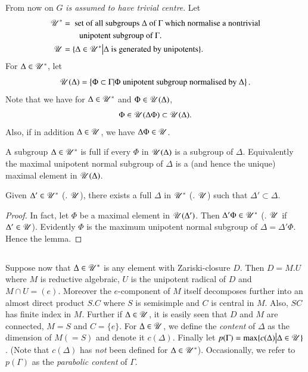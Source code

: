 \subsection{}\label{art9-subsec2.12}
From now on $G$ \textit{is assumed to have trivial centre}. Let
\begin{align*}
\mathscr{U}^\ast & = \text{ set of all subgroups $\Delta$ of $\Gamma$ which normalise a nontrivial}\\
& \text{\qquad  unipotent subgroup of $\Gamma$.}\\
\mathscr{U} & =  \{\Delta \in \mathscr{U}^\ast \big| \Delta \text{ is generated by unipotents} \}.
\end{align*}
For $\Delta \in \mathscr{U}^\ast$, let
$$
\mathscr{U} (\Delta) = \left\{\Phi \subset \Gamma | \Phi \text{ unipotent subgroup normalised by $\Delta$} \right\}. 
$$\pageoriginale 
Note that we have for $\Delta \in \mathscr{U}^\ast$ and $\Phi \in \mathscr{U} (\Delta)$,
$$
\Phi \in \mathscr{U} (\Delta \Phi) \subset \mathscr{U} (\Delta).
$$
Also, if in addition $\Delta \in \mathscr{U}$, we have $\Delta \Phi \in \mathscr{U}$.   

\setcounter{definition}{12}
\begin{definition}\label{art9-def2.13}
A subgroup $\Delta \in \mathscr{U}^\ast$ is full if every $\Phi$ in $\mathscr{U}(\Delta)$ is a subgroup of $\Delta$. Equivalently the maximal unipotent normal subgroup  of $\Delta$ is a (and hence the {\rm unique}) maximal element in $\mathscr{U} (\Delta)$. 
\end{definition}

\begin{lemma}\label{art9-lem2.14}
Given $\Delta' \in \mathscr{U}^\ast$ (\resp. $\mathscr{U}$), there exists a full $\Delta$ in $\mathscr{U}^\ast$ (\resp. $\mathscr{U}$) such that $\Delta' \subset \Delta$.
\end{lemma}

\begin{proof}
In fact, let $\Phi$ be a maximal element in $\mathscr{U}(\Delta')$. Then $\Delta' \Phi \in \mathscr{U}^\ast$ (\resp. $\mathscr{U}$ if $\Delta' \in \mathscr{U}$). Evidently $\Phi$ is the maximum unipotent normal subgroup of $\Delta = \Delta' \Phi$. Hence the lemma. 
\end{proof}

\setcounter{subsection}{14}
\subsection{}\label{art9-subsec2.15}
Suppose now that $\Delta \in \mathscr{U}^\ast$ is any element with Zariski-closure $D$. Then $D = M. U$ where $M$ is reductive algebraic, $U$ is the unipotent radical of $D$ and $M \cap U = (e)$. Moreover the $e$-component of $M$ itself decomposes further into an almost direct product $S.C$ where $S$ is semisimple and $C$ is central in $M$. Also, $SC$ has finite index in $M$. Further if $\Delta \in \mathscr{U}$, it is easily seen that $D$ and $M$ are connected, $M=S$ and $C = \{e\}$. For $\Delta \in \mathscr{U}$, we define the \textit{content} of $\Delta$ as the dimension of $M(=S)$ and denote it $c(\Delta)$. Finally let $p(\Gamma) = \max \{c (\Delta) \big| \Delta \in \mathscr{U}\}$. (Note that $c(\Delta)$ has \textit{not} been defined for $\Delta \in \mathscr{U}^\ast$). Occasionally, we refer to $p(\Gamma)$ as the \textit{parabolic content} of $\Gamma$.

